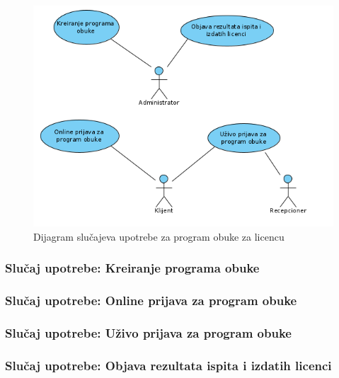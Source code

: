 \documentclass[a4paper]{article}
\begin{document}
\begin{figure}[!ht]
\begin{center}
\includegraphics[scale=0.55]{sections/images/slucajevi_upotrebe_za_licencu.png}
\end{center}
\caption{Dijagram slučajeva upotrebe za program obuke za licencu}
\label{fig:kontekst}
\end{figure}


\subsubsection{Slučaj upotrebe: Kreiranje programa obuke}


\subsubsection{Slučaj upotrebe: Online prijava za program obuke}


\subsubsection{Slučaj upotrebe: Uživo prijava za program obuke}


\subsubsection{Slučaj upotrebe: Objava rezultata ispita i izdatih licenci}

\end{document}
